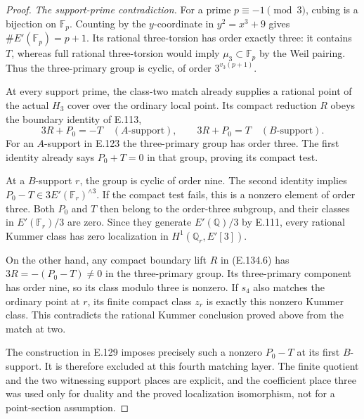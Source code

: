 \begin{proof}
\emph{The support-prime contradiction.}
For a prime $p\equiv-1\pmod3$, cubing is a
bijection on $\mathbb F_p$. Counting by the
$y$-coordinate in $y^2=x^3+9$ gives
$\#E'(\mathbb F_p)=p+1$.
Its rational three-torsion has order exactly
three: it contains $T$, whereas full rational
three-torsion would imply $\mu_3\subset\mathbb F_p$
by the Weil pairing. Thus the three-primary
group is cyclic, of order $3^{v_3(p+1)}$.

At every support prime, the class-two match
already supplies a rational point of the
actual $H_3$ cover over the ordinary local point.
Its compact reduction $R$ obeys the boundary
identity of E.113,
\[
          3R+P_0=-T\quad(A\text{-support}),
          \qquad 3R+P_0=T\quad(B\text{-support}).
 \tag{E.134.6}
\]
For an $A$-support in E.123 the three-primary
group has order three. The first identity
already says $P_0+T=0$ in that group, proving
its compact test.

At a $B$-support $r$, the group is cyclic of
order nine. The second identity implies
$P_0-T\in3E'(\mathbb F_r)^{\wedge3}$.
If the compact test fails, this is a nonzero
element of order three. Both $P_0$ and $T$
then belong to the order-three subgroup, and
their classes in $E'(\mathbb F_r)/3$ are zero.
Since they generate $E'(\mathbb Q)/3$ by E.111,
every rational Kummer class has zero localization
in $H^1(\mathbb Q_r,E'[3])$.

On the other hand, any compact boundary lift
$R$ in (E.134.6) has $3R=-(P_0-T)\ne0$
in the three-primary group. Its three-primary
component has order nine, so its class modulo
three is nonzero. If $s_4$ also matches the
ordinary point at $r$, its finite compact
class $z_r$ is exactly this nonzero Kummer
class. This contradicts the rational Kummer
conclusion proved above from the match at two.

The construction in E.129 imposes precisely
such a nonzero $P_0-T$ at its first $B$-support.
It is therefore excluded at this fourth
matching layer. The finite quotient and the
two witnessing support places are explicit,
and the coefficient place three was used only
for duality and the proved localization
isomorphism, not for a point-section assumption.
\end{proof}

